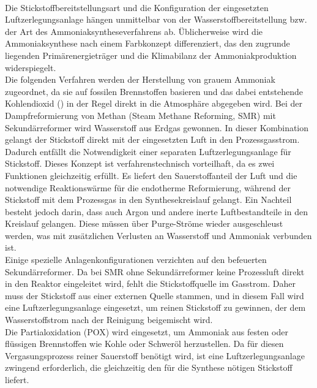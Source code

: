 \\
Die Stickstoffbereitstellungsart und die Konfiguration der eingesetzten Luftzerlegungsanlage hängen unmittelbar von der Wasserstoffbereitstellung bzw. der Art des Ammoniaksyntheseverfahrens ab. Üblicherweise wird die Ammoniaksynthese nach einem Farbkonzept differenziert, das den zugrunde liegenden Primärenergieträger und die Klimabilanz der Ammoniakproduktion widerspiegelt.\\
Die folgenden Verfahren werden der Herstellung von grauem Ammoniak zugeordnet, da sie auf fossilen Brennstoffen basieren und das dabei entstehende Kohlendioxid () in der Regel direkt in die Atmosphäre abgegeben wird.
Bei der Dampfreformierung von Methan (Steam Methane Reforming, SMR) mit Sekundärreformer wird Wasserstoff aus Erdgas gewonnen. In dieser Kombination gelangt der Stickstoff direkt mit der eingesetzten Luft in den Prozessgasstrom. Dadurch entfällt die Notwendigkeit einer separaten Luftzerlegungsanlage für Stickstoff. Dieses Konzept ist verfahrenstechnisch vorteilhaft, da es zwei Funktionen gleichzeitig erfüllt. Es liefert den Sauerstoffanteil der Luft und die notwendige Reaktionswärme für die endotherme Reformierung, während der Stickstoff mit dem Prozessgas in den Synthesekreislauf gelangt. Ein Nachteil besteht jedoch darin, dass auch Argon und andere inerte Luftbestandteile in den Kreislauf gelangen. Diese müssen über Purge-Ströme wieder ausgeschleust werden, was mit zusätzlichen Verlusten an Wasserstoff und Ammoniak verbunden ist. \cite{applAmmonia1Introduction2011,smithReviewAirSeparation2001}\\
Einige spezielle Anlagenkonfigurationen verzichten auf den befeuerten Sekundärreformer. Da bei SMR ohne Sekundärreformer keine Prozessluft direkt in den Reaktor eingeleitet wird, fehlt die Stickstoffquelle im Gasstrom. Daher muss der Stickstoff aus einer externen Quelle stammen, und in diesem Fall wird eine Luftzerlegungsanlage eingesetzt, um reinen Stickstoff zu gewinnen, der dem Wasserstoffstrom nach der Reinigung beigemischt wird. \cite{applAmmonia1Introduction2011,smithReviewAirSeparation2001}\\
Die Partialoxidation (POX) wird eingesetzt, um Ammoniak aus festen oder flüssigen Brennstoffen wie Kohle oder Schweröl herzustellen. Da für diesen Vergasungsprozess reiner Sauerstoff benötigt wird, ist eine Luftzerlegungsanlage zwingend erforderlich, die gleichzeitig den für die Synthese nötigen Stickstoff liefert. \cite{applAmmonia1Introduction2011,smithReviewAirSeparation2001}\\
